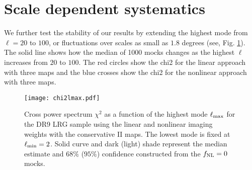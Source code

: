 \section{Scale dependent systematics}\label{sec:scalesys}
 We further test the stability of our results by extending the highest mode from $\ell=20$ to $100$, or fluctuations over scales as small as $1.8$ degrees (see, Fig. \ref{fig:chi2cellextend}). The solid line shows how the median of 1000 mocks changes as the highest $\ell$ increases from $20$ to $100$. The red circles show the chi2 for the linear approach with three maps and the blue crosses show the chi2 for the nonlinear approach with three maps. 

\begin{figure}
\centering
\texttt{[image: chi2lmax.pdf]}
\caption{Cross power spectrum $\chi^{2}$ as a function of the highest mode $\ell_{\rm max}$ for the DR9 LRG sample using the linear and nonlinear imaging weights with the conservative II maps. The lowest mode is fixed at $\ell_{\rm min}=2$. Solid curve and dark (light) shade represent the median estimate and $68\%$ ($95\%$) confidence constructed from the $f_{\rm NL}=0$ mocks.}\label{fig:chi2cellextend}
\end{figure}


%
%
